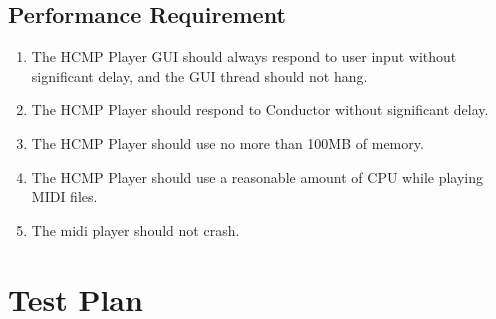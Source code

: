 \subsection{Performance Requirement}
\begin{enumerate}
  \item The HCMP Player GUI should always respond to user input without 
        significant delay, and the GUI thread should not hang.
  \item The HCMP Player should respond to Conductor without significant delay.
  \item The HCMP Player should use no more than 100MB of memory.
  \item The HCMP Player should use a reasonable amount of CPU while playing 
        MIDI files.
  \item The midi player should not crash.
\end{enumerate}

\section{Test Plan}
